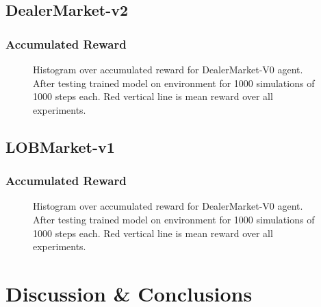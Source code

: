 \documentclass{kththesis}
\theoremstyle{definition}
\begin{document}
\section{DealerMarket-v2}

\subsection*{Accumulated Reward}

\begin{figure}[H]
	    	\centering
		
		\caption{Histogram over accumulated reward for DealerMarket-V0 agent. After testing trained model on environment for 1000 simulations of 1000 steps each. Red vertical line is mean reward over all experiments. }
		\label{fig:dm2}
\end{figure}

\section{LOBMarket-v1}

\subsection*{Accumulated Reward}

\begin{figure}[H]
	    	\centering
		
		\caption{Histogram over accumulated reward for DealerMarket-V0 agent. After testing trained model on environment for 1000 simulations of 1000 steps each. Red vertical line is mean reward over all experiments. }
		\label{fig:dm3}
\end{figure}





\chapter{Discussion \& Conclusions}
\end{document}
